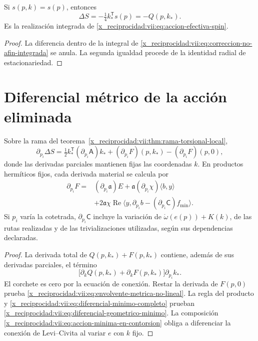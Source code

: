 \begin{corollary}
\label{x_reciprocidad:vii:cor:recuperacion-eliminacion-afin}
Si \(s(p,k)=s(p)\), entonces
\[
 \Delta S=-\tfrac14 k_*^{\mathsf T}s(p)=-Q(p,k_*).
\]
Es la realización integrada de
\eqref{x_reciprocidad:vii:eq:accion-efectiva-spin}.
\end{corollary}
\begin{proof}
La diferencia dentro de la integral de
\eqref{x_reciprocidad:vii:eq:correccion-no-afin-integrada} se anula. La segunda
igualdad procede de la identidad radial de estacionariedad.
\end{proof}

\section{Diferencial métrico de la acción eliminada}
\label{x_reciprocidad:vii:subsec:diferencial-metrico-no-lineal}

\begin{theorem}
\label{x_reciprocidad:vii:thm:envolvente-metrica}
Sobre la rama del teorema~\ref{x_reciprocidad:vii:thm:rama-torsional-local},
\begin{equation}
 \partial_{p_i}\Delta S
 =\tfrac12 k_*^{\mathsf T}(\partial_{p_i}\mathsf A)k_*
  +(\partial_{p_i}F)(p,k_*)-(\partial_{p_i}F)(p,0),
 \label{x_reciprocidad:vii:eq:envolvente-metrica-no-lineal}
\end{equation}
donde las derivadas parciales mantienen fijas las coordenadas \(k\).
En productos hermíticos fijos, cada derivada material se calcula por
\begin{equation}
 \begin{split}
 \partial_{p_i}F={}&(\partial_{p_i}\mathfrak a)E
       +\mathfrak a(\partial_{p_i}\chi)\langle b,y\rangle\\
   &+2\mathfrak a\chi\operatorname{Re}
       \langle y,\partial_{p_i}b
                    -(\partial_{p_i}\mathsf C)f_{\min}\rangle.
 \end{split}
 \label{x_reciprocidad:vii:eq:diferencial-geometrico-minimo}
\end{equation}
Si \(p_i\) varía la cotetrada, \(\partial_{p_i}\mathsf C\)
incluye la variación de
\(\mathring\omega(e(p))+K(k)\), de las rutas realizadas y de
las trivializaciones utilizadas, según sus dependencias declaradas.
\end{theorem}

\begin{proof}
La derivada total de \(Q(p,k_*)+F(p,k_*)\) contiene, además
de sus derivadas parciales, el término
\[
 \bigl[\partial_kQ(p,k_*)+\partial_kF(p,k_*)\bigr]
                      \partial_{p_i}k_*.
\]
El corchete es cero por la ecuación de conexión. Restar la derivada
de \(F(p,0)\) prueba
\eqref{x_reciprocidad:vii:eq:envolvente-metrica-no-lineal}.
La regla del producto y
\eqref{x_reciprocidad:vii:eq:diferencial-minimo-completo} prueban
\eqref{x_reciprocidad:vii:eq:diferencial-geometrico-minimo}. La composición
\eqref{x_reciprocidad:vii:eq:accion-minima-en-contorsion} obliga a diferenciar
la conexión de Levi--Civita al variar \(e\) con \(k\) fijo.
\end{proof}

